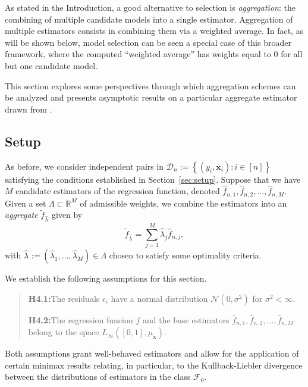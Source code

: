 \documentclass[11pt, letter paper]{article}
\newcommand{\1}{\mathmybb{1}}
\newcommand{\R}{\mathbb{R}}
\newcommand{\0}{\emptyset}
\newcommand{\paren}[1]{\left(#1 \right)}
\newcommand{\set}[1]{\left\{ #1 \right\}}
\newcommand{\data}{\mathcal{D}_{n}}
\newcommand{\Ncal}{\mathcal{N}}
\newcommand{\Fcal}{\mathcal{F}}
\newcommand{\x}{\boldsymbol{x}}
\newcommand{\fhat}[2]{\hat{f}_{#1, #2}}
\newcommand{\ftilde}[1]{\tilde{f}_{#1}}
\newcommand{\lambdahat}[1]{\hat{\lambda}_{#1}}
\begin{document}
As stated in the Introduction, a good alternative to selection is \emph{aggregation}: the combining of multiple candidate models into a single estimator.
Aggregation of multiple estimators consists in combining them via a weighted average. In fact, as will be shown below, model selection can be seen a special case of this broader framework, where the computed ``weighted average'' has weights equal to 0 for all but one candidate model. 

This section explores some perspectives through which aggregation schemes can be analyzed and presents asymptotic results on a particular aggregate estimator drawn from \textcite{bunea_2007}.

\subsection{Setup}

As before, we consider independent pairs in \(\data := \set{\paren{y_{i}, \x_{i}}:i\in [n]}\) satisfying the conditions established in Section~\ref{sec:setup}. Suppose that we have \(M\) candidate estimators of the regression function, denoted \(\fhat{n}{1}, \fhat{n}{2}, \ldots, \fhat{n}{M}\). Given a set \(\Lambda\subset\R^{M}\) of admissible weights, we combine the estimators into an \emph{aggregate} \(\ftilde{\lambdahat{}}\) given by
\[\ftilde{\lambdahat{}} = \sum_{j=1}^{M}\lambdahat{j} \fhat{n}{j},\]
with \(\lambdahat{}:=\paren{\lambdahat{1}, \ldots, \lambdahat{M}}\in \Lambda\) chosen to satisfy some optimality criteria.

We establish the following assumptions for this section.

\begin{quotation}
    \noindent\textbf{H4.1:}\quad The residuals \(\epsilon_{i}\) have a normal distribution \(\Ncal(0, \sigma^{2})\) for \(\sigma^{2}<\infty\).
    
    \vspace{3mm}
    
    \noindent\textbf{H4.2:}\quad The regression funcion \(f\) and the base estimators \(\fhat{n}{1}, \fhat{n}{2}, \ldots, \fhat{n}{M}\) belong to the space \(L_{\infty}([0,1], \mu_{\x})\).
\end{quotation}

Both assumptions grant well-behaved estimators and allow for the application of certain minimax results relating, in particular, to the Kullback-Liebler divergence between the distributions of estimators in the class \(\Fcal_{0}\).
\end{document}
